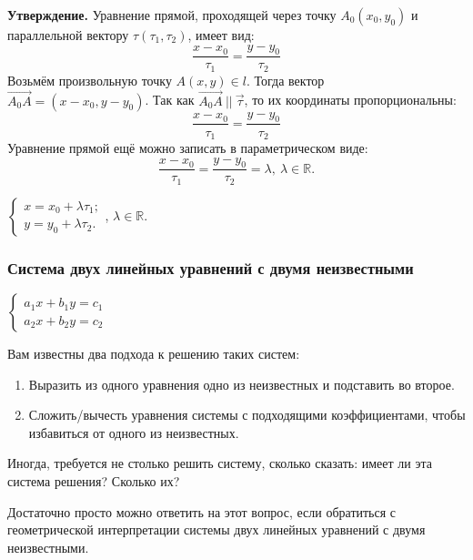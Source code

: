 \documentclass{article}
\begin{document}
    \textbf{Утверждение.} Уравнение прямой, проходящей через точку \(A_0(x_0,y_0)\) и параллельной вектору \(\tau(\tau_1, \tau_2)\), имеет вид:
    \begin{equation}
        \frac{x - x_0}{\tau_1} = \frac{y - y_0}{\tau_2}
    \end{equation}
    Возьмём произвольную точку \(A(x, y) \in l\). Тогда вектор \(\overset{\longrightarrow}{A_0A} = (x - x_0, y - y_0)\). Так как \(\overset{\longrightarrow}{A_0A}\ ||\ \overset{\rightarrow}{\tau}\), то их координаты пропорциональны:
    \[\frac{x - x_0}{\tau_1} = \frac{y - y_0}{\tau_2}\]
    Уравнение прямой ещё можно записать в параметрическом виде:
    \begin{equation}
        \frac{x - x_0}{\tau_1} = \frac{y - y_0}{\tau_2} = \lambda,\ \lambda \in \mathbb{R}.
    \end{equation}
    \begin{center}
        \(\begin{cases}
            x = x_0 + \lambda \tau_1;\\
            y = y_0 + \lambda \tau_2.
        \end{cases}\), \(\lambda \in \mathbb{R}\).
    \end{center}

    \subsubsection{Система двух линейных уравнений с двумя неизвестными}

    \begin{center}
        \(\begin{cases}
            a_1x + b_1y = c_1\\
            a_2x + b_2y = c_2
        \end{cases}\)
    \end{center}
    Вам известны два подхода к решению таких систем:
    \begin{enumerate}
        \item Выразить из одного уравнения одно из неизвестных и подставить во второе.
        \item Сложить/вычесть уравнения системы с подходящими коэффициентами, чтобы избавиться от одного из неизвестных.
    \end{enumerate}
    Иногда, требуется не столько решить систему, сколько сказать: имеет ли эта система решения? Сколько их?

    Достаточно просто можно ответить на этот вопрос, если обратиться с геометрической интерпретации системы двух линейных уравнений с двумя неизвестными.
\end{document}
